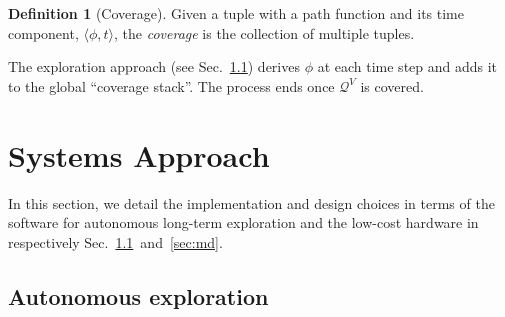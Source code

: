\documentclass[letterpaper,10pt,conference,twoside]{IEEEtran}
\theoremstyle{definition}
\newtheorem{defn}{Definition}[section]
\begin{document}
\begin{defn}[Coverage]\label{def:co}
  Given a tuple with a path function and its time component, $\langle\phi,t\rangle$, the \textit{coverage} is the collection of multiple tuples.
\end{defn}

The %
exploration approach %
(see Sec.~\ref{sec:le}) derives $\phi$ at each time step and adds it to the global ``coverage stack''. The process ends once $\mathcal{Q}^V$ is covered.


\section{Systems Approach}
\label{sec:m}
\noindent
In this section, we detail the implementation and design choices in terms of %
the software for autonomous long-term %
exploration and the low-cost hardware in respectively Sec.~\ref{sec:le}~and~\ref{sec:md}.

\subsection{Autonomous %
exploration}
\label{sec:le}
\end{document}
